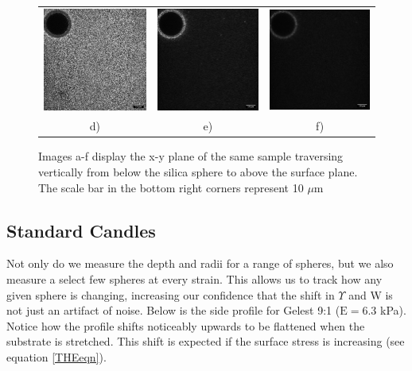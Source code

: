 \begin{figure}[h!]
\begin{tabular}{ccc}
		\includegraphics[width= .33\linewidth]{Chapters/Figures/190215_g91_glass_sphere011_cascade4.png} & \includegraphics[width= .33\linewidth]{Chapters/Figures/190215_g91_glass_sphere011_cascade5.png} & \includegraphics[width= .33\linewidth]{Chapters/Figures/190215_g91_glass_sphere011_cascade6.png}
		\\
		d) & e) & f) 
	\end{tabular}
	\label{fig:sphere011cascade}
	\caption[Vertical path through image stack]{Images a-f display the x-y plane of the same sample traversing vertically from below the silica sphere to above the surface plane. The scale bar in the bottom right corners represent 10 $\mu$m}
\end{figure}

\subsection{Standard Candles}
Not only do we measure the depth and radii for a range of spheres, but we also measure a select few spheres at every strain. This allows us to track how any given sphere is changing, increasing our confidence that the shift in $\Upsilon$ and W is not just an artifact of noise. Below is the side profile for Gelest 9:1 ($\text{E}=6.3$ kPa). Notice how the profile shifts noticeably upwards to be flattened when the substrate is stretched. This shift is expected if the surface stress is increasing (see equation \ref{THEeqn}).

